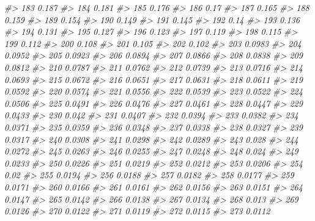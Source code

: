 \documentclass[]{book}
\newenvironment{Shaded}{\begin{snugshade}}{\end{snugshade}}
\newcommand{\CommentTok}[1]{\textcolor[rgb]{0.56,0.35,0.01}{\textit{#1}}}
\begin{document}
\begin{Shaded}
\begin{Highlighting}[]
\CommentTok{#> 183  0.187 }
\CommentTok{#> 184  0.181 }
\CommentTok{#> 185  0.176 }
\CommentTok{#> 186  0.17 }
\CommentTok{#> 187  0.165 }
\CommentTok{#> 188  0.159 }
\CommentTok{#> 189  0.154 }
\CommentTok{#> 190  0.149 }
\CommentTok{#> 191  0.145 }
\CommentTok{#> 192  0.14 }
\CommentTok{#> 193  0.136 }
\CommentTok{#> 194  0.131 }
\CommentTok{#> 195  0.127 }
\CommentTok{#> 196  0.123 }
\CommentTok{#> 197  0.119 }
\CommentTok{#> 198  0.115 }
\CommentTok{#> 199  0.112 }
\CommentTok{#> 200  0.108 }
\CommentTok{#> 201  0.105 }
\CommentTok{#> 202  0.102 }
\CommentTok{#> 203  0.0983 }
\CommentTok{#> 204  0.0952 }
\CommentTok{#> 205  0.0923 }
\CommentTok{#> 206  0.0894 }
\CommentTok{#> 207  0.0866 }
\CommentTok{#> 208  0.0838 }
\CommentTok{#> 209  0.0812 }
\CommentTok{#> 210  0.0787 }
\CommentTok{#> 211  0.0762 }
\CommentTok{#> 212  0.0739 }
\CommentTok{#> 213  0.0716 }
\CommentTok{#> 214  0.0693 }
\CommentTok{#> 215  0.0672 }
\CommentTok{#> 216  0.0651 }
\CommentTok{#> 217  0.0631 }
\CommentTok{#> 218  0.0611 }
\CommentTok{#> 219  0.0592 }
\CommentTok{#> 220  0.0574 }
\CommentTok{#> 221  0.0556 }
\CommentTok{#> 222  0.0539 }
\CommentTok{#> 223  0.0522 }
\CommentTok{#> 224  0.0506 }
\CommentTok{#> 225  0.0491 }
\CommentTok{#> 226  0.0476 }
\CommentTok{#> 227  0.0461 }
\CommentTok{#> 228  0.0447 }
\CommentTok{#> 229  0.0433 }
\CommentTok{#> 230  0.042 }
\CommentTok{#> 231  0.0407 }
\CommentTok{#> 232  0.0394 }
\CommentTok{#> 233  0.0382 }
\CommentTok{#> 234  0.0371 }
\CommentTok{#> 235  0.0359 }
\CommentTok{#> 236  0.0348 }
\CommentTok{#> 237  0.0338 }
\CommentTok{#> 238  0.0327 }
\CommentTok{#> 239  0.0317 }
\CommentTok{#> 240  0.0308 }
\CommentTok{#> 241  0.0298 }
\CommentTok{#> 242  0.0289 }
\CommentTok{#> 243  0.028 }
\CommentTok{#> 244  0.0272 }
\CommentTok{#> 245  0.0263 }
\CommentTok{#> 246  0.0255 }
\CommentTok{#> 247  0.0248 }
\CommentTok{#> 248  0.024 }
\CommentTok{#> 249  0.0233 }
\CommentTok{#> 250  0.0226 }
\CommentTok{#> 251  0.0219 }
\CommentTok{#> 252  0.0212 }
\CommentTok{#> 253  0.0206 }
\CommentTok{#> 254  0.02 }
\CommentTok{#> 255  0.0194 }
\CommentTok{#> 256  0.0188 }
\CommentTok{#> 257  0.0182 }
\CommentTok{#> 258  0.0177 }
\CommentTok{#> 259  0.0171 }
\CommentTok{#> 260  0.0166 }
\CommentTok{#> 261  0.0161 }
\CommentTok{#> 262  0.0156 }
\CommentTok{#> 263  0.0151 }
\CommentTok{#> 264  0.0147 }
\CommentTok{#> 265  0.0142 }
\CommentTok{#> 266  0.0138 }
\CommentTok{#> 267  0.0134 }
\CommentTok{#> 268  0.013 }
\CommentTok{#> 269  0.0126 }
\CommentTok{#> 270  0.0122 }
\CommentTok{#> 271  0.0119 }
\CommentTok{#> 272  0.0115 }
\CommentTok{#> 273  0.0112 }

\end{Highlighting}
\end{Shaded}
\end{document}
